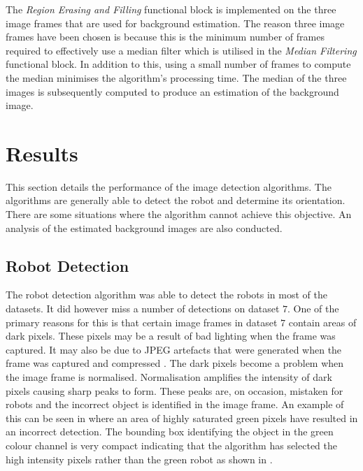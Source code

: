 \documentclass{article}
\begin{document}
The \textit{Region Erasing and Filling} functional block is implemented on the three image frames that are used for background estimation. The reason three image frames have been chosen is because this is the minimum number of frames required to effectively use a median filter which is utilised in the \textit{Median Filtering} functional block. In addition to this, using a small number of frames to compute the median minimises the algorithm's processing time. The median of the three images is subsequently computed to produce an estimation of the background image.

\section{Results}
\label{sec:results}
This section details the performance of the image detection algorithms. The algorithms are generally able to detect the robot and determine its orientation. There are some situations where the algorithm cannot achieve this objective. An analysis of the estimated background images are also conducted.
 
\subsection{Robot Detection}
\label{sec:detect}
The robot detection algorithm was able to detect the robots in most of the datasets.  It did however miss a number of detections on dataset $7$. One of the primary reasons for this is that certain image frames in dataset $7$ contain areas of dark pixels. These pixels may be a result of bad lighting when the frame was captured. It may also be due to JPEG artefacts that were generated when the frame was captured and compressed \cite{ref:digitalprocessing}. The dark pixels become a problem when the image frame is normalised. Normalisation amplifies the intensity of dark pixels causing sharp peaks to form. These peaks are, on occasion, mistaken for robots and the incorrect object is identified in the image frame. An example of this can be seen in  where an area of highly saturated green pixels have resulted in an incorrect detection. The bounding box identifying the object in the green colour channel is very compact indicating that the algorithm has selected the high intensity pixels rather than the green robot as shown in .
\end{document}
